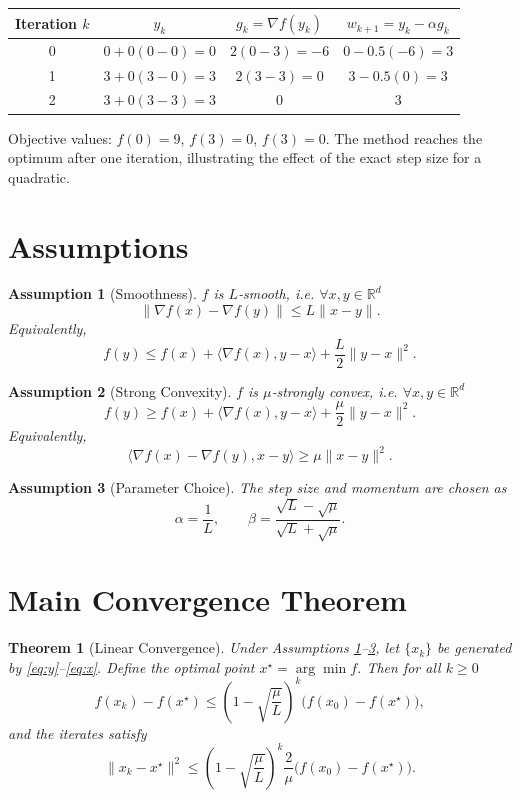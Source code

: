 \documentclass{article}
\newtheorem{theorem}{Theorem}
\newtheorem{assumption}{Assumption}
\newcommand{\R}{\mathbb{R}}
\begin{document}
\begin{center}
\begin{tabular}{c|c|c|c}
Iteration $k$ & $y_{k}$ & $g_{k}=\nabla f(y_{k})$ & $w_{k+1}=y_{k}-\alpha g_{k}$ \\ \hline
0 & $0+0(0-0)=0$ & $2(0-3)=-6$ & $0-0.5(-6)=3$ \\ \hline
1 & $3+0(3-0)=3$ & $2(3-3)=0$ & $3-0.5(0)=3$ \\ \hline
2 & $3+0(3-3)=3$ & $0$ & $3$ \\ 
\end{tabular}
\end{center}
Objective values: $f(0)=9$, $f(3)=0$, $f(3)=0$.  
The method reaches the optimum after one iteration, illustrating the effect of the exact step size for a quadratic.

\newpage
\section*{Assumptions}
\begin{assumption}[Smoothness]\label{ass:smooth}
$f$ is $L$‑smooth, i.e. $\forall x,y\in\R^{d}$
\[
\|\nabla f(x)-\nabla f(y)\|\le L\|x-y\| .
\tag{A1}
\]
Equivalently,
\[
f(y)\le f(x)+\langle\nabla f(x),y-x\rangle+\frac{L}{2}\|y-x\|^{2}.
\tag{A1'}
\]
\end{assumption}

\begin{assumption}[Strong Convexity]\label{ass:strong}
$f$ is $\mu$‑strongly convex, i.e. $\forall x,y\in\R^{d}$
\[
f(y)\ge f(x)+\langle\nabla f(x),y-x\rangle+\frac{\mu}{2}\|y-x\|^{2}.
\tag{A2}
\]
Equivalently,
\[
\langle\nabla f(x)-\nabla f(y),x-y\rangle\ge\mu\|x-y\|^{2}.
\tag{A2'}
\]
\end{assumption}

\begin{assumption}[Parameter Choice]\label{ass:param}
The step size and momentum are chosen as
\[
\alpha=\frac{1}{L},\qquad 
\beta=\frac{\sqrt{L}-\sqrt{\mu}}{\sqrt{L}+\sqrt{\mu}}.
\tag{A3}
\]
\end{assumption}

\section*{Main Convergence Theorem}
\begin{theorem}[Linear Convergence]\label{thm:linear}
Under Assumptions \ref{ass:smooth}–\ref{ass:param}, let $\{x_{k}\}$ be generated by \eqref{eq:y}–\eqref{eq:x}.  
Define the optimal point $x^{\star}= \arg\min f$. Then for all $k\ge 0$
\[
f(x_{k})-f(x^{\star})\le
\left(1-\sqrt{\frac{\mu}{L}}\right)^{k}\bigl(f(x_{0})-f(x^{\star})\bigr),
\tag{T1}
\]
and the iterates satisfy
\[
\|x_{k}-x^{\star}\|^{2}\le
\left(1-\sqrt{\frac{\mu}{L}}\right)^{k}
\frac{2}{\mu}\bigl(f(x_{0})-f(x^{\star})\bigr).
\tag{T2}
\]
\end{theorem}
\end{document}
